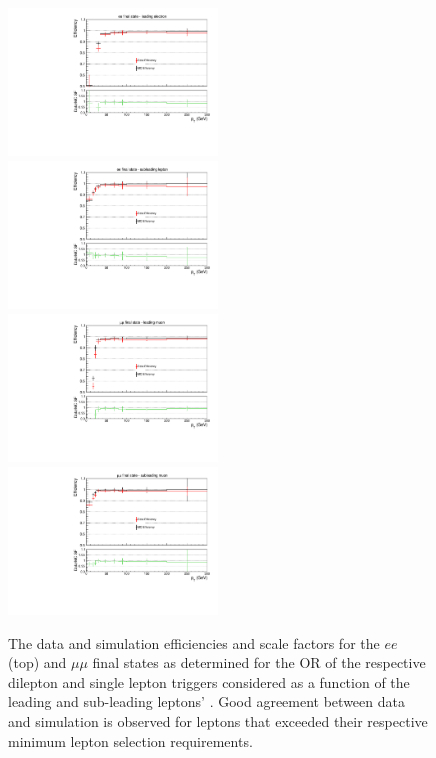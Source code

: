 \begin{figure}[ht]
\centering
\includegraphics[width=0.495\textwidth]{figs/background-estimation/triggerEfficiency/ttbar/electron1_pT_SF_alt.pdf}
\includegraphics[width=0.495\textwidth]{figs/background-estimation/triggerEfficiency/ttbar/electron2_pT_SF_alt.pdf}
\\
\includegraphics[width=0.495\textwidth]{figs/background-estimation/triggerEfficiency/ttbar/muon1_pT_SF_alt.pdf}
\includegraphics[width=0.495\textwidth]{figs/background-estimation/triggerEfficiency/ttbar/muon2_pT_SF_alt.pdf}
\caption{
The data and \ttbar simulation efficiencies and scale factors for the $ee$ (top) and $\mu\mu$ final states as determined for the OR of the respective dilepton and single lepton triggers considered as a function of the leading and sub-leading leptons' \pT. Good agreement between data and simulation is observed for leptons that exceeded their respective minimum lepton \pT selection requirements.
}
\label{fig:trig_pT_SF}
\end{figure}


